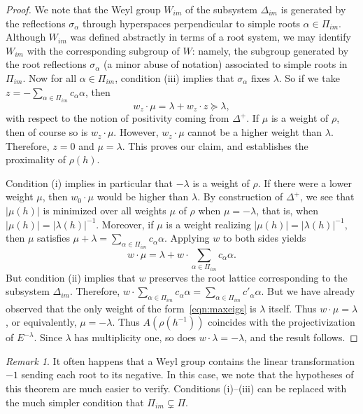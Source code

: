 \documentclass{amsart}
\theoremstyle{plain}
\theoremstyle{definition}
\theoremstyle{remark}
\newtheorem{remark}[theorem]{Remark}
\providecommand{\abs}[1]{\lvert#1\rvert}
\begin{document}
\begin{proof}
We note that the Weyl group $W_{im}$ of the subsystem $\Delta_{im}$ is generated by the
reflections $\sigma_{\alpha}$ through hyperspaces perpendicular to simple roots $\alpha
\in \Pi_{im}$. Although $W_{im}$ was defined abstractly in terms of a root system, we may
identify $W_{im}$ with the corresponding subgroup of $W$: namely,
the subgroup generated by the root reflections $\sigma_{\alpha}$ (a minor abuse of
notation) associated to simple roots in $\Pi_{im}$. Now for all $\alpha \in \Pi_{im}$,
condition (iii) implies that $\sigma_{\alpha}$ fixes $\lambda$. So if we take
$z = -\sum_{\alpha \in \Pi_{im}} c_{\alpha} \alpha$, then
$$w_{z}\cdot \mu = \lambda + w_{z} \cdot z \succcurlyeq \lambda,$$
with respect to the notion of positivity coming from $\Delta^{+}$. If $\mu$ is a weight
of $\rho$, then of course so is $w_{z} \cdot \mu$. However, $w_{z}
\cdot \mu$ cannot be a higher weight than $\lambda$. Therefore, $z = 0$ and $\mu =
\lambda$. This proves our claim, and establishes the proximality of $\rho(h)$.

Condition (i) implies in particular that $-\lambda$ is a weight of $\rho$. If there were
a lower weight $\mu$, then $w_{0}\cdot \mu$ would be higher than $\lambda$. 
By construction of $\Delta^{+}$, we see that $\abs{\mu(h)}$ is minimized over
all weights $\mu$ of $\rho$ when $\mu = - \lambda$, that is, when $\abs{\mu(h)} =
\abs{\lambda(h)}^{-1}$. Moreover, if $\mu$ is a weight realizing $\abs{\mu(h)} =
\abs{\lambda(h)}^{-1}$, then $\mu$ satisfies $\mu + \lambda = \sum_{\alpha \in
\Pi_{im}} c_{\alpha} \alpha$. Applying $w$ to both sides yields
$$w\cdot \mu = \lambda + w \cdot \!\!\!\!\sum_{\alpha \in
\Pi_{im}}\!\!\! c_{\alpha} \alpha.$$
But condition (ii) implies that $w$ preserves the root lattice corresponding to the
subsystem $\Delta_{im}$. Therefore, $w\cdot\sum_{\alpha \in
\Pi_{im}} c_{\alpha} \alpha = \sum_{\alpha \in
\Pi_{im}} c'_{\alpha} \alpha$. But we have already observed that the only weight of the
form~\eqref{eqn:maxeigs} is $\lambda$ itself. Thus $w\cdot \mu = \lambda$, or
equivalently, $\mu = -\lambda$. Thus $A(\rho(h^{-1}))$ coincides with the projectivization
of $E^{-\lambda}$. Since $\lambda$ has multiplicity one, so does $w\cdot \lambda =
-\lambda$, and the result follows.
\end{proof}
\begin{remark}
It often happens that a Weyl group contains the linear transformation $-1$ sending each
root to its negative. In this case, we note that the hypotheses of this theorem are much
easier to verify. Conditions (i)--(iii) can be replaced with the much simpler condition
that $\Pi_{im} \subsetneq \Pi$.
\end{remark}
\end{document}
